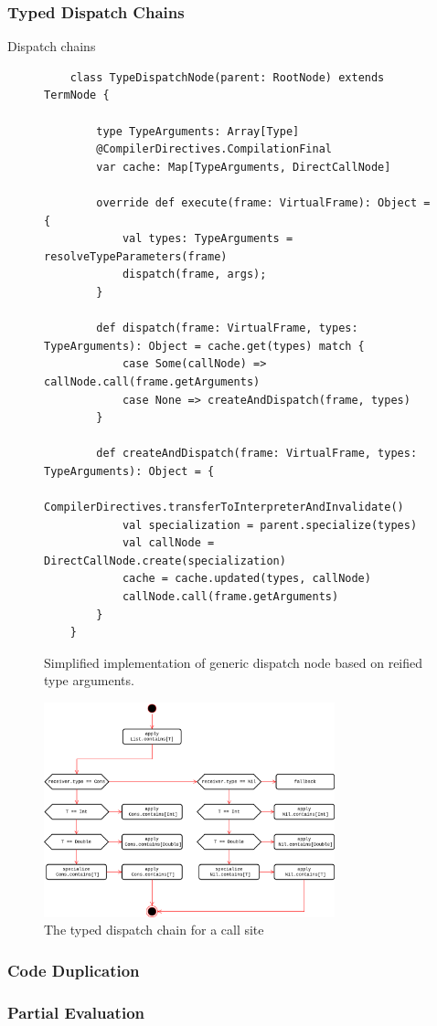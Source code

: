 \subsubsection*{Typed Dispatch Chains}

Dispatch chains\cite{???}

\begin{figure}[H]
	\begin{verbatim}
	class TypeDispatchNode(parent: RootNode) extends TermNode {
		
		type TypeArguments: Array[Type]
		@CompilerDirectives.CompilationFinal
		var cache: Map[TypeArguments, DirectCallNode]
		
		override def execute(frame: VirtualFrame): Object = {
			val types: TypeArguments = resolveTypeParameters(frame)
			dispatch(frame, args);
		}
		
		def dispatch(frame: VirtualFrame, types: TypeArguments): Object = cache.get(types) match {
			case Some(callNode) => callNode.call(frame.getArguments)
			case None => createAndDispatch(frame, types)
		}
		
		def createAndDispatch(frame: VirtualFrame, types: TypeArguments): Object = {
			CompilerDirectives.transferToInterpreterAndInvalidate()
			val specialization = parent.specialize(types)
			val callNode = DirectCallNode.create(specialization)
			cache = cache.updated(types, callNode)
			callNode.call(frame.getArguments)
		}
	}
	\end{verbatim}
\caption{Simplified implementation of generic dispatch node based on reified type arguments.}
\end{figure}

\begin{figure}[H]
	\centering
	\includegraphics[width=0.75\textwidth]{figures/tastytruffle-type-dispatch-chain.png}
	\caption{The typed dispatch chain for a  call site }
\end{figure}

\subsubsection*{Code Duplication}

\subsubsection*{Partial Evaluation}


